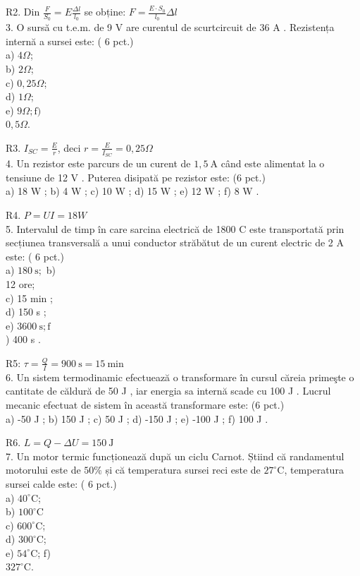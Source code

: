 R2. Din $\frac{F}{S_{0}}=E \frac{\Delta l}{l_{0}}$ se obține: $F=\frac{E \cdot S_{0}}{l_{0}} \Delta l$\\
3. O sursă cu t.e.m. de 9 V are curentul de scurtcircuit de 36 A . Rezistența internă a sursei este: ( 6 pct.)\\
a) $4 \Omega$;\\
b) $2 \Omega$;\\
c) $0,25 \Omega$;\\
d) $1 \Omega$;\\
e) $9 \Omega ; \mathrm{f})$\\
$0,5 \Omega$.

R3. $I_{S C}=\frac{E}{r}$, deci $r=\frac{E}{I_{S C}}=0,25 \Omega$\\
4. Un rezistor este parcurs de un curent de $1,5 \mathrm{~A}$ când este alimentat la o tensiune de 12 V . Puterea disipată pe rezistor este: (6 pct.)\\
a) 18 W ; b) 4 W ; c) 10 W ; d) 15 W ; e) 12 W ; f) 8 W .

R4. $P=U I=18 W$\\
5. Intervalul de timp în care sarcina electrică de 1800 C este transportată prin secțiunea transversală a unui conductor străbătut de un curent electric de 2 A este: ( 6 pct.)\\
a) $180 \mathrm{~s} ;$ b)\\
12 ore;\\
c) 15 min ;\\
d) 150 s ;\\
e) $3600 \mathrm{~s} ; \mathrm{f}$\\
) 400 s .

R5: $\tau=\frac{Q}{I}=900 \mathrm{~s}=15 \mathrm{~min}$\\
6. Un sistem termodinamic efectuează o transformare în cursul căreia primeşte o cantitate de căldură de 50 J , iar energia sa internă scade cu 100 J . Lucrul mecanic efectuat de sistem în această transformare este: (6 pct.)\\
a) -50 J ; b) 150 J ; c) 50 J ; d) -150 J ; e) -100 J ; f) 100 J .

R6. $L=Q-\Delta U=150 \mathrm{~J}$\\
7. Un motor termic funcționează după un ciclu Carnot. Știind că randamentul motorului este de $50 \%$ și că temperatura sursei reci este de $27^{\circ} \mathrm{C}$, temperatura sursei calde este: ( 6 pct.)\\
a) $40^{\circ} \mathrm{C}$;\\
b) $100^{\circ} \mathrm{C}$\\
c) $600^{\circ} \mathrm{C}$;\\
d) $300^{\circ} \mathrm{C}$;\\
e) $54^{\circ} \mathrm{C}$; f)\\
$327^{\circ} \mathrm{C}$.

